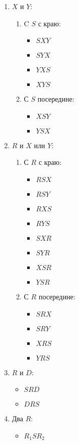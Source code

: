 \begin{enumerate}
	\item $X$ и $Y$:
	\begin{enumerate}
		\item C $S$ с краю:
		\begin{itemize}
			\item $SXY$
			\item $SYX$
			\item $YXS$
			\item $XYS$
		\end{itemize}
		\item С $S$ посередине:
		\begin{itemize}
			\item $XSY$
			\item $YSX$
		\end{itemize}
	\end{enumerate}
	\item $R$ и $X$ или $Y$:
	\begin{enumerate}
		\item С $R$ с краю:
		\begin{itemize}
			\item $RSX$
			\item $RSY$
			\item $RXS$
			\item $RYS$
			\item $SXR$
			\item $SYR$
			\item $XSR$
			\item $YSR$
		\end{itemize}
		\item С $R$ посередине:
		\begin{itemize}
			\item $SRX$
			\item $SRY$
			\item $XRS$
			\item $YRS$
		\end{itemize}
	\end{enumerate}
	\item $R$ и $D$:
	\begin{itemize}
			\item $SRD$
			\item $DRS$
	\end{itemize}
	\item Два $R$:
	\begin{itemize}
			\item $R_1SR_2$
	\end{itemize}
\end{enumerate}

